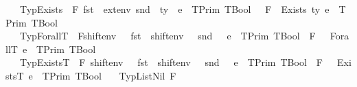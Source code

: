 \begin{isabellebody}
\ \ {\isacharbar}{\kern0pt}\ TypExists{\isacharcolon}{\kern0pt}\ {\isachardoublequoteopen}{\isasymlbrakk}\ F{\isacharcomma}{\kern0pt}\ {\isacharparenleft}{\kern0pt}fst\ {\isasymDelta}{\isacharcomma}{\kern0pt}\ ext{\isacharunderscore}{\kern0pt}env\ {\isacharparenleft}{\kern0pt}snd\ {\isasymDelta}{\isacharparenright}{\kern0pt}\ ty{\isacharparenright}{\kern0pt}\ {\isasymturnstile}\ e\ {\isacharcolon}{\kern0pt}\ TPrim\ {\isacharparenleft}{\kern0pt}TBool{\isacharparenright}{\kern0pt}\ {\isasymrbrakk}\ {\isasymLongrightarrow}\ F{\isacharcomma}{\kern0pt}{\isasymDelta}\ {\isasymturnstile}\ Exists\ ty\ e\ {\isacharcolon}{\kern0pt}\ TPrim\ {\isacharparenleft}{\kern0pt}TBool{\isacharparenright}{\kern0pt}{\isachardoublequoteclose}\isanewline
\ \ {\isacharbar}{\kern0pt}\ TypForallT{\isacharcolon}{\kern0pt}\ {\isachardoublequoteopen}{\isasymlbrakk}\ F{\isacharcomma}{\kern0pt}{\isacharparenleft}{\kern0pt}shift{\isacharunderscore}{\kern0pt}env\ {}\ {}\ {\isacharparenleft}{\kern0pt}fst\ {\isasymDelta}{\isacharparenright}{\kern0pt}{\isacharcomma}{\kern0pt}\ shift{\isacharunderscore}{\kern0pt}env\ {}\ {}\ {\isacharparenleft}{\kern0pt}snd\ {\isasymDelta}{\isacharparenright}{\kern0pt}{\isacharparenright}{\kern0pt}\ {\isasymturnstile}\ e\ {\isacharcolon}{\kern0pt}\ TPrim\ {\isacharparenleft}{\kern0pt}TBool{\isacharparenright}{\kern0pt}{\isasymrbrakk}\ {\isasymLongrightarrow}\ F{\isacharcomma}{\kern0pt}\ {\isasymDelta}\ {\isasymturnstile}\ ForallT\ e\ {\isacharcolon}{\kern0pt}\ TPrim\ {\isacharparenleft}{\kern0pt}TBool{\isacharparenright}{\kern0pt}{\isachardoublequoteclose}\isanewline
\ \ {\isacharbar}{\kern0pt}\ TypExistsT{\isacharcolon}{\kern0pt}\ {\isachardoublequoteopen}{\isasymlbrakk}\ F{\isacharcomma}{\kern0pt}\ {\isacharparenleft}{\kern0pt}shift{\isacharunderscore}{\kern0pt}env\ {}\ {}\ {\isacharparenleft}{\kern0pt}fst\ {\isasymDelta}{\isacharparenright}{\kern0pt}{\isacharcomma}{\kern0pt}\ shift{\isacharunderscore}{\kern0pt}env\ {}\ {}\ {\isacharparenleft}{\kern0pt}snd\ {\isasymDelta}{\isacharparenright}{\kern0pt}{\isacharparenright}{\kern0pt}\ {\isasymturnstile}\ e\ {\isacharcolon}{\kern0pt}\ TPrim\ {\isacharparenleft}{\kern0pt}TBool{\isacharparenright}{\kern0pt}{\isasymrbrakk}\ {\isasymLongrightarrow}\ F{\isacharcomma}{\kern0pt}\ {\isasymDelta}\ {\isasymturnstile}\ ExistsT\ e\ {\isacharcolon}{\kern0pt}\ TPrim\ {\isacharparenleft}{\kern0pt}TBool{\isacharparenright}{\kern0pt}{\isachardoublequoteclose}\isanewline
\ \ {\isacharbar}{\kern0pt}\ TypListNil{\isacharcolon}{\kern0pt}\ {\isachardoublequoteopen}F{\isacharcomma}{\kern0pt}{\isasymDelta}\ {\isasymturnstile}\ {\isacharbrackleft}{\kern0pt}{\isacharbrackright}{\kern0pt}\ {\isacharbrackleft}{\kern0pt}{\isacharcolon}{\kern0pt}{\isacharbrackright}{\kern0pt}\ {\isacharbrackleft}{\kern0pt}{\isacharbrackright}{\kern0pt}{\isachardoublequoteclose}\isanewline

\end{isabellebody}
